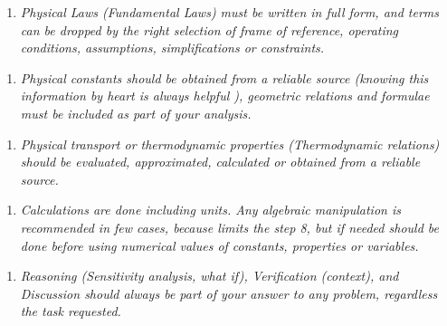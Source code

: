 \documentclass{article}
\begin{document}
\begin{enumerate}[resume]
\item \textit{Physical Laws (Fundamental Laws) must be written in full form, and terms can be dropped by the right selection of frame of reference, operating conditions, assumptions, simplifications or constraints.}
\end{enumerate}



\begin{enumerate}[resume]
\item \textit{Physical constants should be obtained from a reliable source (knowing this information by heart is always helpful ), geometric relations and formulae must be included as part of your analysis.}
\end{enumerate}



\begin{enumerate}[resume]
\item \textit{Physical transport or thermodynamic properties (Thermodynamic relations) should be evaluated, approximated, calculated or obtained from a reliable source.}
\end{enumerate}



\begin{enumerate}[resume]
\item \textit{Calculations are done including units. Any algebraic manipulation is recommended in few cases, because limits the step 8, but if needed should be done before using numerical values of constants, properties or variables.}
\end{enumerate}



\begin{enumerate}[resume]
\item \textit{Reasoning (Sensitivity analysis, what if), Verification (context), and Discussion should always be part of your answer to any problem, regardless the task requested.}
\end{enumerate}



\printbibliography[title={References}]
\end{document}
